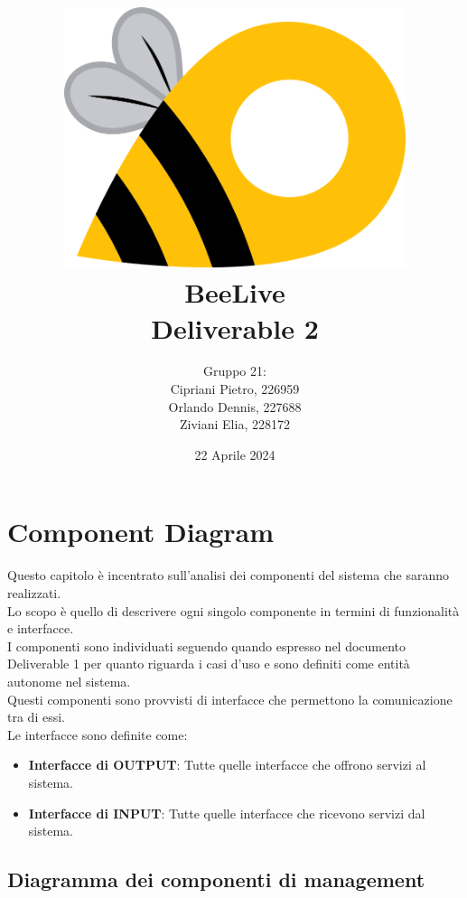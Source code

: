\documentclass{article}
\title{\includegraphics[width=0.75\textwidth]{Images/BeeLive-Logo.png}\\\vspace{100pt}
\LARGE{\textbf{BeeLive\\Deliverable 2}}}
\author{Gruppo 21:\\
Cipriani Pietro, 226959\\
Orlando Dennis, 227688\\
Ziviani Elia, 228172}
\date{22 Aprile 2024}
\begin{document}
\maketitle
\thispagestyle{firstpage} %
\clearpage

\pagestyle{nonplain} %

\renewcommand{\contentsname}{Indice}
\tableofcontents

\clearpage

\section{Component Diagram}

Questo capitolo è incentrato sull'analisi dei componenti del sistema che saranno realizzati.\\
Lo scopo è quello di descrivere ogni singolo componente in termini di funzionalità e interfacce.\\

I componenti sono individuati seguendo quando espresso nel documento Deliverable 1 per quanto riguarda i casi d'uso e sono definiti come entità autonome nel sistema.\\
Questi componenti sono provvisti di interfacce che permettono la comunicazione tra di essi.\\
Le interfacce sono definite come:
\begin{itemize}
    \item \textbf{Interfacce di OUTPUT}: Tutte quelle interfacce che offrono servizi al sistema.
    \item \textbf{Interfacce di INPUT}: Tutte quelle interfacce che ricevono servizi dal sistema.
\end{itemize} 

\subsection{Diagramma dei componenti di management}
\end{document}
